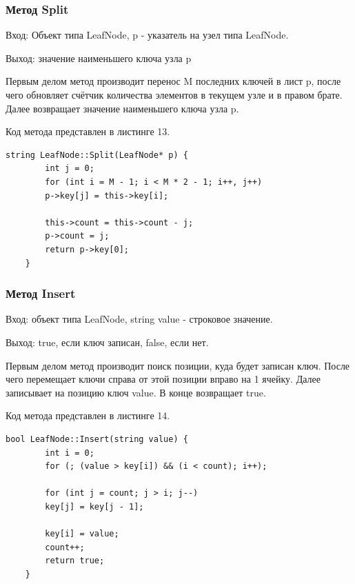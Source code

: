 \documentclass[11pt,a4paper,final]{article} %
\begin{document}
\subsubsection{Метод Split}
Вход: Объект типа LeafNode, p - указатель на узел типа LeafNode. \par
Выход: значение наименьшего ключа узла p\par
Первым делом метод производит перенос M последних ключей в лист p, после чего обновляет счётчик количества элементов в текущем узле и в правом брате. Далее возвращает значение наименьшего ключа узла p. \par
Код метода представлен в листинге 13.
\begin{lstlisting}[label=Split, caption = Метод Split]
	string LeafNode::Split(LeafNode* p) {
		int j = 0;
		for (int i = M - 1; i < M * 2 - 1; i++, j++) 
		p->key[j] = this->key[i];
		
		this->count = this->count - j;
		p->count = j;
		return p->key[0];
	}
\end{lstlisting}

\subsubsection{Метод Insert}
Вход: объект типа LeafNode, string value - строковое значение. \par
Выход: true, если ключ записан, false, если нет. \par
Первым делом метод производит поиск позиции, куда будет записан ключ. После чего перемещает ключи справа от этой позиции вправо на 1 ячейку. Далее записывает на позицию ключ value. В конце возвращает true. \par
Код метода представлен в листинге 14.
\begin{lstlisting}[label=Insert, caption = Метод Insert]
	bool LeafNode::Insert(string value) {
		int i = 0;
		for (; (value > key[i]) && (i < count); i++);
		
		for (int j = count; j > i; j--)
		key[j] = key[j - 1];
		
		key[i] = value;
		count++;
		return true;
	}
\end{lstlisting}
\end{document}
